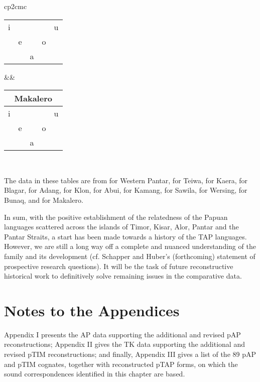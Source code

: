 \documentclass[output=paper]{LSP/langsci}
\begin{document}
\begin{table}
\begin{tabular}{cp{2cm}c}
\begin{tabular}{p{.7cm}p{.7cm}p{.7cm}p{.7cm}p{.7cm}}
  i &      &      &      &  u\\
    &   e  &      &   o   &  \\ 
    &      &   a  &      &   \\
  \end{tabular}
  &&
  \begin{tabular}{p{.7cm}p{.7cm}p{.7cm}p{.7cm}p{.7cm}}
  \multicolumn{5}{c}{Makalero}\\
\midrule

  i &      &      &      &  u\\
    &   e  &      &   o   &  \\ 
    &      &   a  &      &   \\
  \end{tabular}\\
\mybottomrule
\end{tabular} 

{\scriptsize The data in these tables are from \citet{Holtonta} for Western Pantar, \citet{Klamer2010} for Teiwa, \citet{Klamerta} for Kaera, \citet{Steinhauerta} for Blagar, \citet{Haan2001} for Adang, \citet{Baird2008} for Klon, \citet{Kratochvil2007} for Abui, \citet{Schapperndb} for Kamang, \citet{Kratochvilta} for Sawila, \citet{SchapperEtAlta} for Wersing, \citet{Schapper2010} for Bunaq, and \citet{Huber2011} for Makalero.
}
\setlength{\tabcolsep}{6pt}
\end{table} 


In sum, with the positive establishment of the relatedness of the Papuan languages scattered across the islands of Timor, Kisar, Alor, Pantar and the Pantar Straits, a start has been made towards a history of the TAP languages. However, we are still a long way off a complete and nuanced understanding of the family and its development (cf. Schapper and Huber's (forthcoming) statement of prospective research questions). It will be the task of future reconstructive historical work to definitively solve remaining issues in the comparative data. 


\section{Notes to the Appendices}
Appendix I presents the AP data supporting the additional and revised pAP reconstructions; Appendix II gives the TK data supporting the additional and revised pTIM reconstructions; and finally, Appendix III gives a list of the 89 pAP and pTIM cognates, together with reconstructed pTAP forms, on which the sound correspondences identified in this chapter are based. 
\end{document}
